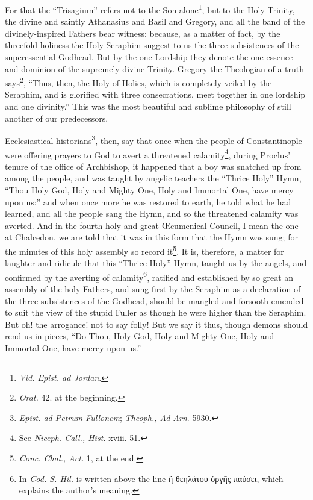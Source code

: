 For that the “Trisagium” refers not to the Son alone\footnote{\emph{Vid. Epist. ad Jordan}.}, but to the Holy Trinity, the divine and saintly Athanasius and Basil and Gregory, and all the band of the divinely-inspired Fathers bear witness: because, as a matter of fact, by the threefold holiness the Holy Seraphim suggest to us the three subsistences of the superessential Godhead. But by the one Lordship they denote the one essence and dominion of the supremely-divine Trinity. Gregory the Theologian of a truth says\footnote{\emph{Orat. }42. at the beginning.}, “Thus, then, the Holy of Holies, which is completely veiled by the Seraphim, and is glorified with three consecrations, meet together in one lordship and one divinity.” This was the most beautiful and sublime philosophy of still another of our predecessors.

Ecclesiastical historians\footnote{\emph{Epist. ad Petrum Fullonem}; \emph{Theoph., Ad Arn}. 5930.}, then, say that once when the people of Constantinople were offering prayers to God to avert a threatened calamity\footnote{See \emph{Niceph. Call., Hist. }xviii. 51.}, during Proclus’ tenure of the office of Archbishop, it happened that a boy was snatched up from among the people, and was taught by angelic teachers the “Thrice Holy” Hymn, “Thou Holy God, Holy and Mighty One, Holy and Immortal One, have mercy upon us:” and when once more he was restored to earth, he told what he had learned, and all the people sang the Hymn, and so the threatened calamity was averted. And in the fourth holy and great Œcumenical Council, I mean the one at Chalcedon, we are told that it was in this form that the Hymn was sung; for the minutes of this holy assembly so record it\footnote{\emph{Conc. Chal., Act. }1, at the end.}. It is, therefore, a matter for laughter and ridicule that this “Thrice Holy” Hymn, taught us by the angels, and confirmed by the averting of calamity\footnote{In \emph{Cod. S. Hil. }is written above the line \textgreek{ἢ θεηλάτου ὀργῆς παύσει}, which explains the author’s meaning.}, ratified and established by so great an assembly of the holy Fathers, and sung first by the Seraphim as a declaration of the three subsistences of the Godhead, should be mangled and forsooth emended to suit the view of the stupid Fuller as though he were higher than the Seraphim. But oh! the arrogance! not to say folly! But we say it thus, though demons should rend us in pieces, “Do Thou, Holy God, Holy and Mighty One, Holy and Immortal One, have mercy upon us.”


